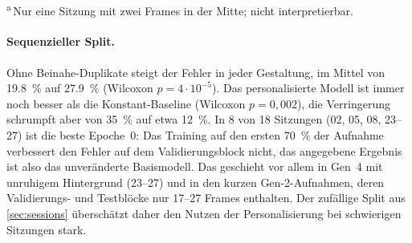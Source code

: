 \documentclass[
  11pt,
  a4paper,
  oneside,
  DIV=12,
  BCOR=8mm,
  parskip=half,
  headings=normal,
  bibliography=totoc,
  listof=totoc
]{scrreprt}
\newcommand{\code}[1]{\texttt{#1}}
\begin{document}
\begin{table}[htbp]
  \centering
  \caption{Testfehler pro Bildschirmregion (\cref{sec:partition}, $r=0,15$),
           Mittelwert über die Sitzungen einer Gestaltung; in Klammern die
           Gesamtzahl der Testframes in der Region. Basismodell
           \code{norm\_subject}.}
  \label{tab:region_errors}
  \footnotesize
  \setlength{\tabcolsep}{3.5pt}
  \\[1mm]
  \parbox{0.95\linewidth}{\footnotesize \textsuperscript{a}\,Nur eine Sitzung
  mit zwei Frames in der Mitte; nicht interpretierbar.}
\end{table}

\paragraph{Sequenzieller Split.} Ohne Beinahe-Duplikate steigt der Fehler in
jeder Gestaltung, im Mittel von \SI{19,8}{\percent} auf \SI{27,9}{\percent}
(Wilcoxon $p=4\cdot10^{-5}$). Das personalisierte Modell ist immer noch besser
als die Konstant-Baseline (Wilcoxon $p=0,002$), die Verringerung schrumpft
aber von \SI{35}{\percent} auf etwa \SI{12}{\percent}. In 8 von 18 Sitzungen
(02, 05, 08, 23--27) ist die beste Epoche~0: Das Training auf den ersten
\SI{70}{\percent} der Aufnahme verbessert den Fehler auf dem
Validierungsblock nicht, das angegebene Ergebnis ist also das unveränderte
Basismodell. Das geschieht vor allem in Gen~4 mit unruhigem Hintergrund
(23--27) und in den kurzen Gen-2-Aufnahmen, deren Validierungs- und
Testblöcke nur 17--27 Frames enthalten. Der zufällige Split aus
\cref{sec:sessions} überschätzt daher den Nutzen der Personalisierung bei
schwierigen Sitzungen stark.
\end{document}
